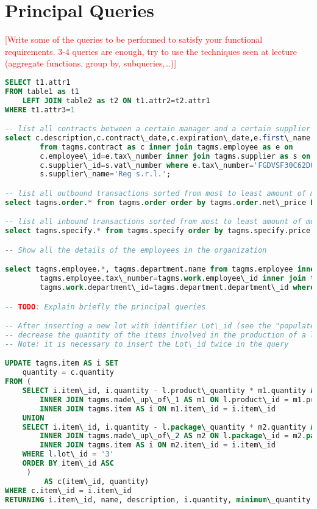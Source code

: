 \section{Principal Queries}
\textcolor{red}{[Write some of the queries to be performed to satisfy your functional requirements. 3-4 queries are enough, try to use the techniques seen at lecture (aggregate functions, group by, subqueries,…)]}

\begin{lstlisting}[language=SQL,
keywordstyle=\color{blue},
stringstyle=\color{mauve},
showstringspaces=false,
basicstyle=\ttfamily\footnotesize]
SELECT t1.attr1
FROM table1 as t1
    LEFT JOIN table2 as t2 ON t1.attr2=t2.attr1 
WHERE t1.attr3=1

-- list all contracts between a certain manager and a certain supplier
select c.description,c.contract\_date,c.expiration\_date,e.first\_name as manager\_name,e.last\_name as manager\_surname
		from tagms.contract as c inner join tagms.employee as e on
        c.employee\_id=e.tax\_number inner join tagms.supplier as s on
        c.supplier\_id=s.vat\_number where e.tax\_number='FGDVSF30C62D012T' and
        s.supplier\_name='Reg s.r.l.';

-- list all outbound transactions sorted from most to least amount of money:
select tagms.order.* from tagms.order order by tagms.order.net\_price DESC;

-- list all inbound transactions sorted from most to least amount of money:
select tagms.specify.* from tagms.specify order by tagms.specify.price DESC;

-- Show all the details of the employees in the organization

select tagms.employee.*, tagms.department.name from tagms.employee inner join tagms.work on
        tagms.employee.tax\_number=tagms.work.employee\_id inner join tagms.department on
        tagms.work.department\_id=tagms.department.department\_id where tagms.employee.still\_working=TRUE;

-- TODO: Explain briefly the principal queries

-- After inserting a new lot with identifier Lot\_id (see the "populate" section)
-- decrease the quantity of the items involved in the production of a lot
-- Note: it is necessary to insert the Lot\_id twice in the query

UPDATE tagms.item AS i SET
    quantity = c.quantity
FROM (
    SELECT i.item\_id, i.quantity - l.product\_quantity * m1.quantity AS quantity FROM tagms.lot AS l
        INNER JOIN tagms.made\_up\_of\_1 AS m1 ON l.product\_id = m1.product\_id
        INNER JOIN tagms.item AS i ON m1.item\_id = i.item\_id
    UNION
    SELECT i.item\_id, i.quantity - l.package\_quantity * m2.quantity AS quantity FROM tagms.lot AS l
        INNER JOIN tagms.made\_up\_of\_2 AS m2 ON l.package\_id = m2.package\_id
        INNER JOIN tagms.item AS i ON m2.item\_id = i.item\_id
    WHERE l.lot\_id = '3'
    ORDER BY item\_id ASC
     )
         AS c(item\_id, quantity)
WHERE c.item\_id = i.item\_id
RETURNING i.item\_id, name, description, i.quantity, minimum\_quantity, item\_category\_id;




\end{lstlisting}
